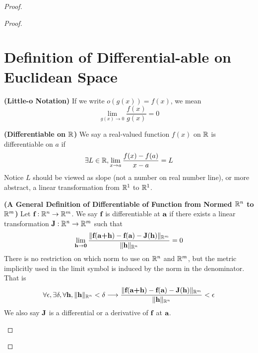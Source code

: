 \documentclass{report}
\begin{document}
\begin{proof}
\begin{proof}
\section{Definition of Differential-able on Euclidean Space} 
\begin{definition}
\label{5.2.1}
\textbf{(Little-o Notation)} If we write $o(g(x))=f(x)$, we mean
\begin{equation}
\lim_{g(x)\to 0}\frac{f(x)}{g(x)}=0
\end{equation}
\end{definition}
\begin{definition}
\label{5.2.2}
\textbf{(Differentiable on $\mathbb{R}$)} We say a real-valued function $f(x)$ on $\mathbb{R}$ is differentiable on $a$ if 
\begin{equation}
\exists L\in \mathbb{R}, \lim_{x \to a}\frac{f(x)-f(a)}{x-a}=L
\end{equation}
Notice $L$ should be viewed as slope (not a number on real number line), or more abstract, a linear transformation from $\mathbb{R}^1$ to  $\mathbb{R}^1$. 
\end{definition}
\begin{definition}
\label{5.2.3}
\textbf{(A General Definition of Differentiable of Function from Normed $\mathbb{R}^n$ to $\mathbb{R}^m$)} Let $\textbf{f}:\mathbb{R}^n\rightarrow \mathbb{R}^m$. We say $\textbf{f}$ is differentiable at $\textbf{a}$ if there exists a linear transformation $\textbf{J}:\mathbb{R}^n\rightarrow \mathbb{R}^m$ such that
\begin{equation}
\lim_{\textbf{h}\to \textbf{0}}\frac{\| \textbf{f}(\textbf{a+h})-\textbf{f}(\textbf{a})-\textbf{J}(\textbf{h}) \|_{\mathbb{R}^m}}{\| \textbf{h} \|_{\mathbb{R}^n}}=0
\end{equation}
There is no restriction on which norm to use on $\mathbb{R}^n$ and $\mathbb{R}^m$, but the metric implicitly used in the limit symbol is induced by the norm in the denominator. That is
\begin{equation}
\forall \epsilon, \exists \delta, \forall \textbf{h},\| \textbf{h} \|_{\mathbb{R}^n}<\delta \longrightarrow \frac{\| \textbf{f}(\textbf{a+h})-\textbf{f}(\textbf{a})-\textbf{J}(\textbf{h}) \|_{\mathbb{R}^m}}{\| \textbf{h} \|_{\mathbb{R}^n}}<\epsilon
\end{equation}
We also say $\textbf{J}$ is a differential or a derivative of $\textbf{f}$ at $\textbf{a}$.
\end{definition}


\end{proof}
\end{proof}
\end{document}
